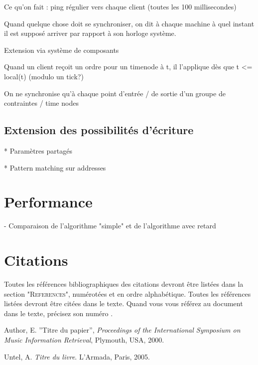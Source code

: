 \documentclass{article}
\begin{document}
Ce qu'on fait : ping régulier vers chaque client (toutes les 100 millisecondes)

Quand quelque chose doit se synchroniser, on dit à chaque machine à quel instant il est supposé arriver par rapport à son horloge système.

Extension via système de composants

Quand un client reçoit un ordre pour un timenode à t, il l'applique dès que t <= local(t) (modulo un tick?)

On ne synchronise qu'à chaque point d'entrée / de sortie d'un groupe de contraintes / time nodes
\subsection{Extension des possibilités d'écriture}
* Paramètres partagés

* Pattern matching sur addresses 

\section{Performance}
- Comparaison de l'algorithme "simple" et de l'algorithme avec retard

\section{Citations}

Toutes les références bibliographiques des citations devront être listées dans la section "\textsc{References}", numérotées et en ordre alphabétique. Toutes les références  listées devront être citées dans le texte. Quand  vous vous référez au document dans le texte, précisez son numéro \cite{Author:00}.
\begin{figure}
    \begin{tikzpicture}
   
    \end{tikzpicture}
\end{figure}
\begin{thebibliography}{2}

 Author, E.
''Titre du papier'',
{\it Proceedings of the International Symposium on Music Information
Retrieval}, Plymouth, USA, 2000.

 Untel, A.
{\it  Titre du livre}.
L'Armada, Paris, 2005.

\end{thebibliography}
\end{document}
